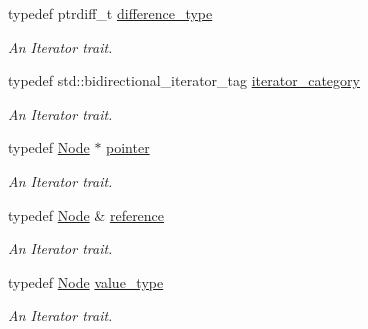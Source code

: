 \begin{DoxyCompactItemize}
\item 
\hypertarget{classMezzanine_1_1xml_1_1NodeIterator_a94781c0d2995ff71c9f56fefc8cdbb61}{
typedef ptrdiff\_\-t \hyperlink{classMezzanine_1_1xml_1_1NodeIterator_a94781c0d2995ff71c9f56fefc8cdbb61}{difference\_\-type}}
\label{classMezzanine_1_1xml_1_1NodeIterator_a94781c0d2995ff71c9f56fefc8cdbb61}

\begin{DoxyCompactList}\small\item\em An Iterator trait. \item\end{DoxyCompactList}\item 
\hypertarget{classMezzanine_1_1xml_1_1NodeIterator_ae5390022983b69d8fbca07eff9934f01}{
typedef std::bidirectional\_\-iterator\_\-tag \hyperlink{classMezzanine_1_1xml_1_1NodeIterator_ae5390022983b69d8fbca07eff9934f01}{iterator\_\-category}}
\label{classMezzanine_1_1xml_1_1NodeIterator_ae5390022983b69d8fbca07eff9934f01}

\begin{DoxyCompactList}\small\item\em An Iterator trait. \item\end{DoxyCompactList}\item 
\hypertarget{classMezzanine_1_1xml_1_1NodeIterator_a83764d631f9ae1405721ec67cb692a21}{
typedef \hyperlink{classMezzanine_1_1xml_1_1Node}{Node} $\ast$ \hyperlink{classMezzanine_1_1xml_1_1NodeIterator_a83764d631f9ae1405721ec67cb692a21}{pointer}}
\label{classMezzanine_1_1xml_1_1NodeIterator_a83764d631f9ae1405721ec67cb692a21}

\begin{DoxyCompactList}\small\item\em An Iterator trait. \item\end{DoxyCompactList}\item 
\hypertarget{classMezzanine_1_1xml_1_1NodeIterator_a0075caef915bb28ff8d4bfdae33b7881}{
typedef \hyperlink{classMezzanine_1_1xml_1_1Node}{Node} \& \hyperlink{classMezzanine_1_1xml_1_1NodeIterator_a0075caef915bb28ff8d4bfdae33b7881}{reference}}
\label{classMezzanine_1_1xml_1_1NodeIterator_a0075caef915bb28ff8d4bfdae33b7881}

\begin{DoxyCompactList}\small\item\em An Iterator trait. \item\end{DoxyCompactList}\item 
\hypertarget{classMezzanine_1_1xml_1_1NodeIterator_ae7d636eb5832e99a42ed3d444eb40609}{
typedef \hyperlink{classMezzanine_1_1xml_1_1Node}{Node} \hyperlink{classMezzanine_1_1xml_1_1NodeIterator_ae7d636eb5832e99a42ed3d444eb40609}{value\_\-type}}
\label{classMezzanine_1_1xml_1_1NodeIterator_ae7d636eb5832e99a42ed3d444eb40609}

\begin{DoxyCompactList}\small\item\em An Iterator trait. \item\end{DoxyCompactList}\end{DoxyCompactItemize}
